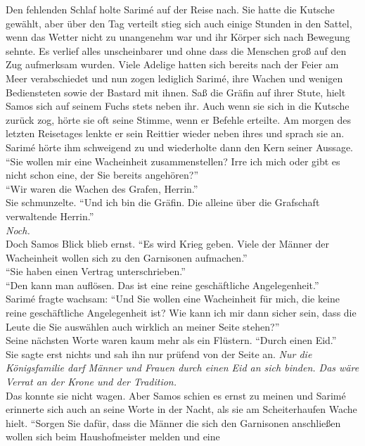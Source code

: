 Den fehlenden Schlaf holte Sarimé auf der Reise nach. Sie hatte die Kutsche gewählt, aber über den 
Tag verteilt stieg sich auch einige Stunden in den Sattel, wenn das Wetter nicht zu unangenehm war 
und ihr Körper sich nach Bewegung sehnte. Es verlief alles unscheinbarer und ohne dass die Menschen 
groß auf den Zug aufmerksam wurden. Viele Adelige hatten sich bereits nach der Feier am Meer 
verabschiedet und nun zogen lediglich Sarimé, ihre Wachen und wenigen Bediensteten sowie der Bastard 
mit ihnen. Saß die Gräfin auf ihrer Stute, hielt Samos sich auf seinem Fuchs stets neben ihr. Auch 
wenn sie sich in die Kutsche zurück zog, hörte sie oft seine Stimme, wenn er Befehle erteilte. Am 
morgen des letzten Reisetages lenkte er sein Reittier wieder neben ihres und sprach sie an.
Sarimé hörte ihm schweigend zu und wiederholte dann den Kern seiner Aussage. \\
``Sie wollen mir eine Wacheinheit zusammenstellen? Irre ich mich oder gibt es nicht schon eine, der 
Sie bereits angehören?''\\
``Wir waren die Wachen des Grafen, Herrin.''\\
Sie schmunzelte. ``Und ich bin die Gräfin. Die alleine über die Grafschaft verwaltende Herrin.''\\
\textit{Noch.}\\
Doch Samos Blick blieb ernst. ``Es wird Krieg geben. Viele der Männer der Wacheinheit wollen sich 
zu den Garnisonen aufmachen.''\\
``Sie haben einen Vertrag unterschrieben.''\\
``Den kann man auflösen. Das ist eine reine geschäftliche Angelegenheit.''\\
Sarimé fragte wachsam: ``Und Sie wollen eine Wacheinheit für mich, die keine reine geschäftliche 
Angelegenheit ist? Wie kann ich mir dann sicher sein, dass die Leute die Sie auswählen auch 
wirklich an meiner Seite stehen?''\\
Seine nächsten Worte waren kaum mehr als ein Flüstern. ``Durch einen Eid.''\\
Sie sagte erst nichts und sah ihn nur prüfend von der Seite an. \textit{Nur die Königsfamilie darf 
Männer und Frauen durch einen Eid an sich binden. Das wäre Verrat an der Krone und der Tradition.}\\
Das konnte sie nicht wagen. Aber Samos schien es ernst zu meinen und Sarimé erinnerte sich auch an 
seine Worte in der Nacht, als sie am Scheiterhaufen Wache hielt. ``Sorgen Sie dafür, dass die 
Männer die sich den Garnisonen anschließen wollen sich beim Haushofmeister melden und eine 
